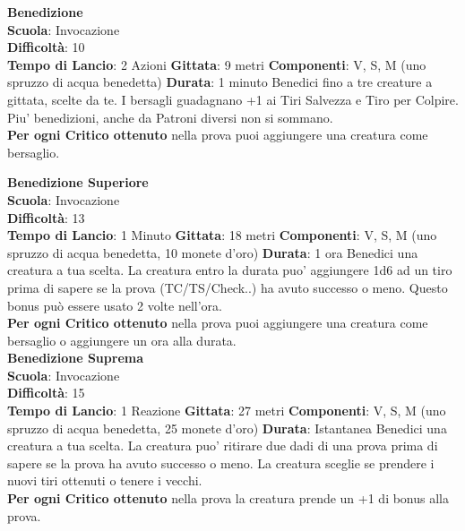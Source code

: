 \begin{multicols}{2}
\medskip\textbf{Benedizione}\\
\textbf{Scuola}: Invocazione\\
\textbf{Difficoltà}: 10\\
\textbf{Tempo di Lancio}: 2 Azioni
\textbf{Gittata}: 9 metri
\textbf{Componenti}: V, S, M (uno spruzzo di acqua benedetta)
\textbf{Durata}: 1 minuto
Benedici fino a tre creature a gittata, scelte da te. I bersagli guadagnano +1 ai Tiri Salvezza e Tiro per Colpire.\\
Piu' benedizioni, anche da Patroni diversi non si sommano.\\
\textbf{Per ogni Critico ottenuto} nella prova puoi aggiungere una creatura come bersaglio.

\medskip\textbf{Benedizione Superiore}\\
\textbf{Scuola}: Invocazione\\
\textbf{Difficoltà}: 13\\
\textbf{Tempo di Lancio}: 1 Minuto
\textbf{Gittata}: 18 metri
\textbf{Componenti}: V, S, M (uno spruzzo di acqua benedetta, 10 monete d'oro)
\textbf{Durata}: 1 ora
Benedici una creatura a tua scelta. La creatura entro la durata puo' aggiungere 1d6 ad un tiro prima di sapere se la prova (TC/TS/Check..) ha avuto successo o meno. Questo bonus può essere usato 2 volte nell'ora.\\
\textbf{Per ogni Critico ottenuto} nella prova puoi aggiungere una creatura come bersaglio o aggiungere un ora alla durata.\\

\medskip\textbf{Benedizione Suprema}\\
\textbf{Scuola}: Invocazione\\
\textbf{Difficoltà}: 15\\
\textbf{Tempo di Lancio}: 1 Reazione
\textbf{Gittata}: 27 metri
\textbf{Componenti}: V, S, M (uno spruzzo di acqua benedetta, 25 monete d'oro)
\textbf{Durata}: Istantanea
Benedici una creatura a tua scelta. La creatura puo' ritirare due dadi di una prova prima di sapere se la prova ha avuto successo o meno. La creatura sceglie se prendere i nuovi tiri ottenuti o tenere i vecchi.\\
\textbf{Per ogni Critico ottenuto} nella prova la creatura prende un +1 di bonus alla prova.\\


\end{multicols}
